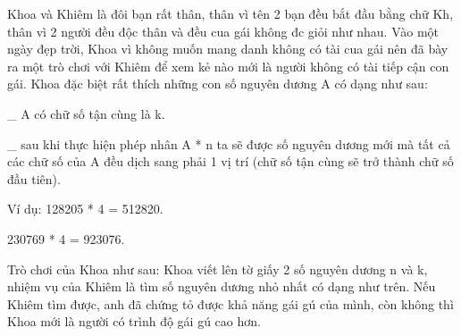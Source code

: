 Khoa và Khiêm là đôi bạn rất thân, thân vì tên 2 bạn đều bắt đầu bằng chữ Kh, thân vì 2 người đều độc thân và đều cua gái không đc giỏi như nhau. Vào một ngày đẹp trời, Khoa vì không muốn mang danh không có tài cua gái nên đã bày ra một trò chơi với Khiêm để xem kẻ nào mới là người không có tài tiếp cận con gái. Khoa đặc biệt rất thích những con số nguyên dương A có dạng như sau:   


   \_ A có chữ số tận cùng là k.   


   \_ sau khi thực hiện phép nhân A * n ta sẽ được số nguyên dương mới mà tất cả các chữ số của A đều dịch sang phải 1 vị trí (chữ số tận cùng sẽ trở thành chữ số đầu tiên).   


   Ví dụ:      128205 * 4 = 512820.   


   230769 * 4 = 923076.  

   Trò chơi của Khoa như sau: Khoa viết lên tờ giấy 2 số nguyên dương n và k, nhiệm vụ của Khiêm là tìm số nguyên dương nhỏ nhất có dạng như trên. Nếu Khiêm tìm được, anh đã chứng tỏ được khả năng gái gú của mình, còn không thì Khoa mới là người có trình độ gái gú cao hơn.